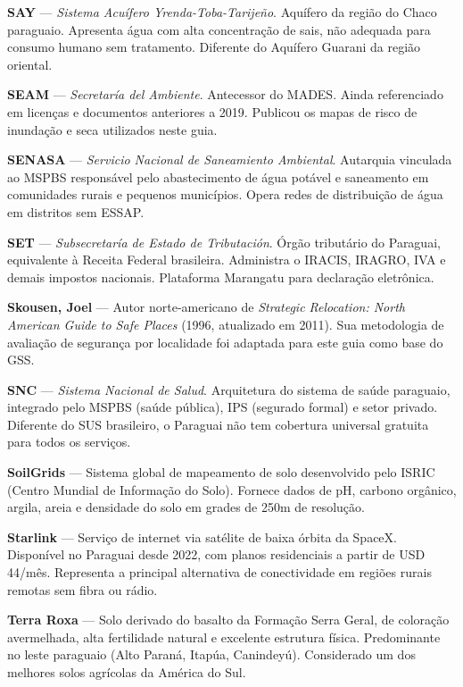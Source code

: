 \medskip
\noindent\textbf{SAY} — \textit{Sistema Acuífero Yrenda-Toba-Tarijeño}. Aquífero da região do Chaco paraguaio. Apresenta água com alta concentração de sais, não adequada para consumo humano sem tratamento. Diferente do Aquífero Guarani da região oriental.

\medskip
\noindent\textbf{SEAM} — \textit{Secretaría del Ambiente}. Antecessor do MADES. Ainda referenciado em licenças e documentos anteriores a 2019. Publicou os mapas de risco de inundação e seca utilizados neste guia.

\medskip
\noindent\textbf{SENASA} — \textit{Servicio Nacional de Saneamiento Ambiental}. Autarquia vinculada ao MSPBS responsável pelo abastecimento de água potável e saneamento em comunidades rurais e pequenos municípios. Opera redes de distribuição de água em distritos sem ESSAP.

\medskip
\noindent\textbf{SET} — \textit{Subsecretaría de Estado de Tributación}. Órgão tributário do Paraguai, equivalente à Receita Federal brasileira. Administra o IRACIS, IRAGRO, IVA e demais impostos nacionais. Plataforma Marangatu para declaração eletrônica.

\medskip
\noindent\textbf{Skousen, Joel} — Autor norte-americano de \textit{Strategic Relocation: North American Guide to Safe Places} (1996, atualizado em 2011). Sua metodologia de avaliação de segurança por localidade foi adaptada para este guia como base do GSS.

\medskip
\noindent\textbf{SNC} — \textit{Sistema Nacional de Salud}. Arquitetura do sistema de saúde paraguaio, integrado pelo MSPBS (saúde pública), IPS (segurado formal) e setor privado. Diferente do SUS brasileiro, o Paraguai não tem cobertura universal gratuita para todos os serviços.

\medskip
\noindent\textbf{SoilGrids} — Sistema global de mapeamento de solo desenvolvido pelo ISRIC (Centro Mundial de Informação do Solo). Fornece dados de pH, carbono orgânico, argila, areia e densidade do solo em grades de 250m de resolução.

\medskip
\noindent\textbf{Starlink} — Serviço de internet via satélite de baixa órbita da SpaceX. Disponível no Paraguai desde 2022, com planos residenciais a partir de USD 44/mês. Representa a principal alternativa de conectividade em regiões rurais remotas sem fibra ou rádio.

\medskip
\noindent\textbf{Terra Roxa} — Solo derivado do basalto da Formação Serra Geral, de coloração avermelhada, alta fertilidade natural e excelente estrutura física. Predominante no leste paraguaio (Alto Paraná, Itapúa, Canindeyú). Considerado um dos melhores solos agrícolas da América do Sul.

